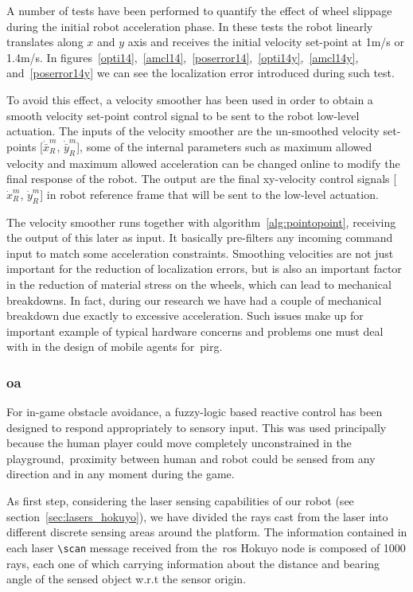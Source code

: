 A number of tests have been performed to quantify the effect of wheel slippage during the initial robot acceleration phase. In these tests the robot linearly translates along $x$ and $y$ axis and receives the initial velocity set-point at 1m/s or 1.4m/s. In figures~\ref{opti14},~\ref{amcl14},~\ref{poserror14},~\ref{opti14y},~\ref{amcl14y}, and~\ref{poserror14y} we can see the localization error introduced during such test.

To avoid this effect, a velocity smoother has been used in order to obtain a smooth velocity set-point control signal to be sent to the robot low-level actuation. The inputs of the velocity smoother are the un-smoothed velocity set-points [$\dot{\bar{x}}_R^m$, $\dot{\bar{y}}_R^m$], some of the internal parameters such as maximum allowed velocity and maximum allowed acceleration can be changed online to modify the final response of the robot. The output are the final xy-velocity control signals [$\dot{x}_R^m$, $\dot{y}_R^m$] in robot reference frame that will be sent to the low-level actuation.

The velocity smoother runs together with algorithm~\ref{alg:pointopoint}, receiving the output of this later as input. It basically pre-filters any incoming command input to match some acceleration constraints. Smoothing velocities are not just important for the reduction of localization errors, but is also an important factor in the reduction of material stress on the wheels, which can lead to mechanical breakdowns. In fact, during our research we have had a couple of mechanical breakdown due exactly to excessive acceleration. Such issues make up for important example of typical hardware concerns and problems one must deal with in the design of mobile agents for~\gls{pirg}.

\subsubsection{\glsdesc{oa}}\label{sec:obt_avoidance}
For in-game obstacle avoidance, a fuzzy-logic based reactive control has been designed to respond appropriately to sensory input. This was used principally because the human player could move completely unconstrained in the playground,~\ie proximity between human and robot could be sensed from any direction and in any moment during the game. 

As first step, considering the laser sensing capabilities of our robot (see section~\ref{sec:lasers_hokuyo}), we have divided the rays cast from the laser into different discrete sensing areas around the platform. The information  contained in each laser \verb|\scan| message received from the~\gls{ros} Hokuyo node is composed of 1000 rays, each one of which carrying information about the distance and bearing angle of the sensed object w.r.t the sensor origin. 

